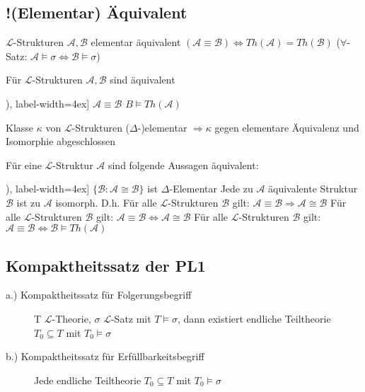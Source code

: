 \documentclass[12pt,a4paper]{article} %
\begin{document}
	\subsection{!(Elementar) Äquivalent}
	$\mathcal{L}$-Strukturen $\mathcal{A}, \mathcal{B}$ elementar äquivalent $(\mathcal{A} \equiv \mathcal{B}) \Leftrightarrow Th(\mathcal{A}) = Th(\mathcal{B})$ ($\forall$-Satz: $\mathcal{A} \vDash \sigma \Leftrightarrow \mathcal{B} \vDash \sigma$)
	
	Für $\mathcal{L}$-Strukturen $\mathcal{A}, \mathcal{B}$ sind äquivalent
	\begin{tasks}[counter-format=(tsk[r]), label-width=4ex]
		\task $\mathcal{A} \equiv \mathcal{B}$
		\task $B \vDash Th(\mathcal{A})$
	\end{tasks}
	
	Klasse $\kappa$ von $\mathcal{L}$-Strukturen ($\Delta$-)elementar $\Rightarrow \kappa$ gegen elementare Äquivalenz und Isomorphie abgeschlossen 
	
	Für eine $\mathcal{L}$-Struktur $\mathcal{A}$ sind folgende Aussagen äquivalent:
	\begin{tasks}[counter-format=(tsk[r]), label-width=4ex]
		\task $\{\mathcal{B}: \mathcal{A} \cong \mathcal{B}\}$ ist $\Delta$-Elementar
		\task Jede zu $\mathcal{A}$ äquivalente Struktur $\mathcal{B}$ ist zu $\mathcal{A}$ isomorph. D.h. Für alle $\mathcal{L}$-Strukturen $\mathcal{B}$ gilt: $\mathcal{A} \equiv \mathcal{B} \Rightarrow \mathcal{A} \cong \mathcal{B}$
		\task Für alle $\mathcal{L}$-Strukturen $\mathcal{B}$ gilt: $\mathcal{A} \equiv \mathcal{B} \Leftrightarrow \mathcal{A} \cong \mathcal{B}$
		\task Für alle $\mathcal{L}$-Strukturen $\mathcal{B}$ gilt: $\mathcal{A} \equiv \mathcal{B} \Leftrightarrow \mathcal{B} \vDash Th(\mathcal{A})$
	\end{tasks}

	\subsection{Kompaktheitssatz der PL1}
	\begin{description}
		\item[a.) Kompaktheitssatz für Folgerungsbegriff] T $\mathcal{L}$-Theorie, $\sigma$ $\mathcal{L}$-Satz mit $T \vDash \sigma$, dann existiert endliche Teiltheorie $T_0 \subseteq T$ mit $T_0 \vDash \sigma$ 
		\item[b.) Kompaktheitssatz für Erfüllbarkeitsbegriff] Jede endliche Teiltheorie $T_0 \subseteq T$ mit $T_0 \vDash \sigma$ 
	\end{description}
\end{document}
